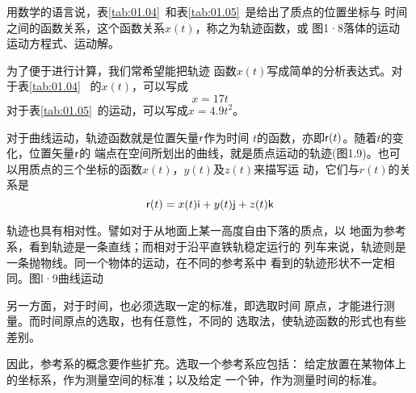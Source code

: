 用数学的语言说，表\ref{tab:01.04}~和表\ref{tab:01.05}~是给出了质点的位置坐标与
时间之间的函数关系，这个函数关系$x(t)$，称之为轨迹函数，或
图1·8落体的运动
运动方程式、运动解。

为了便于进行计算，我们常希望能把轨迹
函数$x(t)$写成简单的分析表达式。对于表\ref{tab:01.04}~
的$x(t)$，可以写成
\begin{equation}\label{equ:01.05.01}
    x=17t
\end{equation}
对于表\ref{tab:01.05}~的运动，可以写成$x=4.9t^2$。

对于曲线运动，轨迹函数就是位置矢量${\sf r}$作为时间
$t$的函数，亦即${\sf r}(t)$。随着$t$的变化，位置矢量${\sf r}$的
端点在空间所划出的曲线，就是质点运动的轨迹(图1.9)。也可
以用质点的三个坐标的函数$x(t)$，$y(t)$及$z(t)$来描写运
动，它们与$r(t)$的关系是
\begin{equation}\label{equ:01.05.02}
    {\sf r}(t)=x(t){\sf i}+y(t){\sf j}+z(t){\sf k}
\end{equation}

轨迹也具有相对性。譬如对于从地面上某一高度自由下落的质点，以
地面为参考系，看到轨迹是一条直线；而相对于沿平直铁轨稳定运行的
列车来说，轨迹则是一条抛物线。同一个物体的运动，在不同的参考系中
看到的轨迹形状不一定相同。图l·9曲线运动

另一方面，对于时间，也必须选取一定的标准，即选取时间
原点，才能进行测量。而时间原点的选取，也有任意性，不同的
选取法，使轨迹函数的形式也有些差别。

因此，参考系的概念要作些扩充。选取一个参考系应包括：
给定放置在某物体上的坐标系，作为测量空间的标准；以及给定
一个钟，作为测量时间的标准。